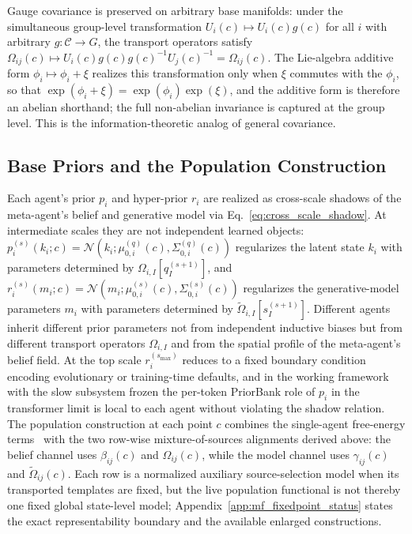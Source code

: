 \documentclass[11pt]{article}
\begin{document}
Gauge covariance is preserved on arbitrary base manifolds: under the simultaneous group-level transformation $U_i(c) \mapsto U_i(c) g(c)$ for all $i$ with arbitrary $g: \mathcal{C} \to G$, the transport operators satisfy $\Omega_{ij}(c) \mapsto U_i(c) g(c) g(c)^{-1} U_j(c)^{-1} = \Omega_{ij}(c)$. The Lie-algebra additive form $\phi_i \mapsto \phi_i + \xi$ realizes this transformation only when $\xi$ commutes with the $\phi_i$, so that $\exp(\phi_i + \xi) = \exp(\phi_i)\exp(\xi)$, and the additive form is therefore an abelian shorthand; the full non-abelian invariance is captured at the group level. This is the information-theoretic analog of general covariance.

\subsection{Base Priors and the Population Construction}

Each agent's prior $p_i$ and hyper-prior $r_i$ are realized as cross-scale shadows of the meta-agent's belief and generative model via Eq.~\eqref{eq:cross_scale_shadow}. At intermediate scales they are not independent learned objects: $p_i^{(s)}(k_i; c) = \mathcal{N}(k_i; \mu_{0,i}^{(q)}(c), \Sigma_{0,i}^{(q)}(c))$ regularizes the latent state $k_i$ with parameters determined by $\Omega_{i,I}[q_I^{(s+1)}]$, and $r_i^{(s)}(m_i; c) = \mathcal{N}(m_i; \mu_{0,i}^{(s)}(c), \Sigma_{0,i}^{(s)}(c))$ regularizes the generative-model parameters $m_i$ with parameters determined by $\tilde\Omega_{i,I}[s_I^{(s+1)}]$. Different agents inherit different prior parameters not from independent inductive biases but from different transport operators $\Omega_{i,I}$ and from the spatial profile of the meta-agent's belief field. At the top scale $r_i^{(s_{\max})}$ reduces to a fixed boundary condition encoding evolutionary or training-time defaults, and in the working framework with the slow subsystem frozen the per-token PriorBank role of $p_i$ in the transformer limit is local to each agent without violating the shadow relation. The population construction at each point $c$ combines the single-agent free-energy terms~\cite{Friston2010, parr2022active} with the two row-wise mixture-of-sources alignments derived above: the belief channel uses $\beta_{ij}(c)$ and $\Omega_{ij}(c)$, while the model channel uses $\gamma_{ij}(c)$ and $\tilde{\Omega}_{ij}(c)$. Each row is a normalized auxiliary source-selection model when its transported templates are fixed, but the live population functional is not thereby one fixed global state-level model; Appendix~\ref{app:mf_fixedpoint_status} states the exact representability boundary and the available enlarged constructions.
\end{document}
